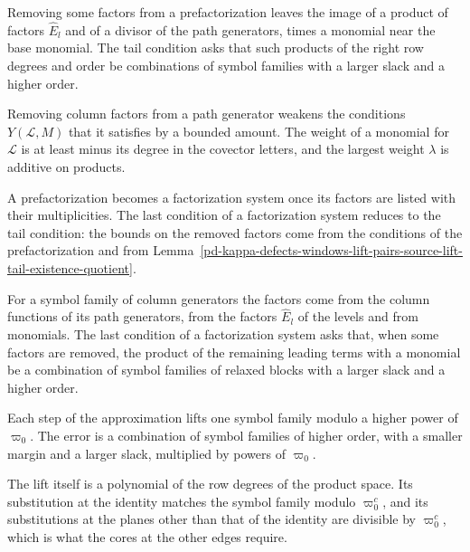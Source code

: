 Removing some factors from a prefactorization leaves the image of a product of factors $\hat E_l$ and of a divisor of the path
generators, times a monomial near the base monomial. The tail condition asks that such products of the right row degrees and
order be combinations of symbol families with a larger slack and a higher order.

Removing column factors from a path generator weakens the conditions $Y(\mathcal L,M)$ that it satisfies by a bounded amount.
The weight of a monomial for $\mathcal L$ is at least minus its degree in the covector letters, and the largest weight $\lambda$
is additive on products.

A prefactorization becomes a factorization system once its factors are listed with their multiplicities. The last condition of
a factorization system reduces to the tail condition: the bounds on the removed factors come from the conditions of the
prefactorization and from Lemma~\ref{pd-kappa-defects-windows-lift-pairs-source-lift-tail-existence-quotient}.

For a symbol family of column generators the factors come from the column functions of its path generators, from the
factors $\hat E_l$ of the levels and from monomials. The last condition of a factorization system asks that, when some
factors are removed, the product of the remaining leading terms with a monomial be a combination of symbol families of
relaxed blocks with a larger slack and a higher order.

Each step of the approximation lifts one symbol family modulo a higher power of $\varpi_0$. The error is a combination of
symbol families of higher order, with a smaller margin and a larger slack, multiplied by powers of $\varpi_0$.

The lift itself is a polynomial of the row degrees of the product space. Its substitution at the identity matches the symbol
family modulo $\varpi_0^c$, and its substitutions at the planes other than that of the identity are divisible by
$\varpi_0^c$, which is what the cores at the other edges require.

